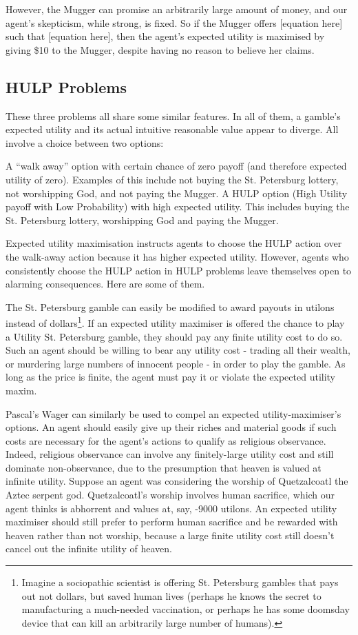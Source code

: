 \documentclass{article}
\begin{document}
However, the Mugger can promise an arbitrarily large amount of money, and our agent's skepticism, while strong, is fixed. So if the Mugger offers [equation here] such that [equation here], then the agent's expected utility is maximised by giving \$10 to the Mugger, despite having no reason to believe her claims.

\subsection{HULP Problems}
These three problems all share some similar features. In all of them, a gamble's expected utility and its actual intuitive reasonable value appear to diverge. All involve a choice between two options:

A “walk away” option with certain chance of zero payoff (and therefore expected utility of zero). Examples of this include not buying the St. Petersburg lottery, not worshipping God, and not paying the Mugger.
A HULP option (High Utility payoff with Low Probability) with high expected utility. This includes buying the St. Petersburg lottery, worshipping God and paying the Mugger.

Expected utility maximisation instructs agents to choose the HULP action over the walk-away action because it has higher expected utility. However, agents who consistently choose the HULP action in HULP problems leave themselves open to alarming consequences. Here are some of them.

The St. Petersburg gamble can easily be modified to award payouts in utilons instead of dollars\footnote{Imagine a sociopathic scientist is offering St. Petersburg gambles that pays out not dollars, but saved human lives (perhaps he knows the secret to manufacturing a much-needed vaccination, or perhaps he has some doomsday device that can kill an arbitrarily large number of humans).}. If an expected utility maximiser is offered the chance to play a Utility St. Petersburg gamble, they should pay any finite utility cost to do so. Such an agent should be willing to bear any utility cost - trading all their wealth, or murdering large numbers of innocent people - in order to play the gamble. As long as the price is finite, the agent must pay it or violate the expected utility maxim.

Pascal's Wager can similarly be used to compel an expected utility-maximiser's options. An agent should easily give up their riches and material goods if such costs are necessary for the agent's actions to qualify as religious observance. Indeed, religious observance can involve any finitely-large utility cost and still dominate non-observance, due to the presumption that heaven is valued at infinite utility. Suppose an agent was considering the worship of Quetzalcoatl the Aztec serpent god. Quetzalcoatl's worship involves human sacrifice, which our agent thinks is abhorrent and values at, say, -9000 utilons. An expected utility maximiser should still prefer to perform human sacrifice and be rewarded with heaven rather than not worship, because a large finite utility cost still doesn't cancel out the infinite utility of heaven. 
\end{document}
